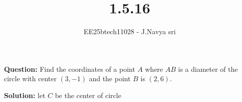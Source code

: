 \documentclass[journal]{IEEEtran}
\begin{document}

\vspace{3cm}

\title{1.5.16}
\author{EE25btech11028 - J.Navya sri}
{\let\newpage\relax\maketitle}

\renewcommand{\thefigure}{\theenumi}
\renewcommand{\thetable}{\theenumi}
\setlength{\intextsep}{10pt} %


\renewcommand{\thetable}{\theenumi}
\textbf{Question:}  
Find the coordinates of a point $A$ where $AB$ is a diameter of the circle with center  
$(3, -1)$ and the point $B$ is $(2, 6)$.
\bigskip

\textbf{Solution:}
let $C$ be the center of circle
\bigskip
\end{document}

